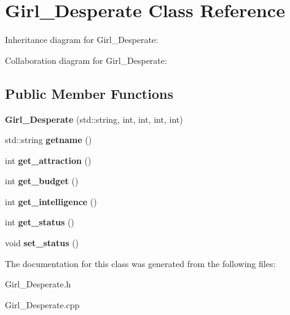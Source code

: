 \hypertarget{classGirl__Desperate}{}\section{Girl\+\_\+\+Desperate Class Reference}
\label{classGirl__Desperate}


Inheritance diagram for Girl\+\_\+\+Desperate\+:


Collaboration diagram for Girl\+\_\+\+Desperate\+:
\subsection*{Public Member Functions}
\begin{DoxyCompactItemize}
\item 
{\bfseries Girl\+\_\+\+Desperate} (std\+::string, int, int, int, int)\hypertarget{classGirl__Desperate_add023864f71aee01c2e7efe84e8ce83d}{}\label{classGirl__Desperate_add023864f71aee01c2e7efe84e8ce83d}

\item 
std\+::string {\bfseries getname} ()\hypertarget{classGirl__Desperate_a4f0be5205c7ae8b0829a9101e2898010}{}\label{classGirl__Desperate_a4f0be5205c7ae8b0829a9101e2898010}

\item 
int {\bfseries get\+\_\+attraction} ()\hypertarget{classGirl__Desperate_ac47c5f05c9058b5d1f2ef0dc95e3c8a0}{}\label{classGirl__Desperate_ac47c5f05c9058b5d1f2ef0dc95e3c8a0}

\item 
int {\bfseries get\+\_\+budget} ()\hypertarget{classGirl__Desperate_af09039e413575be4e3320b22a2dbb176}{}\label{classGirl__Desperate_af09039e413575be4e3320b22a2dbb176}

\item 
int {\bfseries get\+\_\+intelligence} ()\hypertarget{classGirl__Desperate_acfa34b818088ca6abe315d0b4fa19552}{}\label{classGirl__Desperate_acfa34b818088ca6abe315d0b4fa19552}

\item 
int {\bfseries get\+\_\+status} ()\hypertarget{classGirl__Desperate_ad52564d8ebde5752b22d276252807eb8}{}\label{classGirl__Desperate_ad52564d8ebde5752b22d276252807eb8}

\item 
void {\bfseries set\+\_\+status} ()\hypertarget{classGirl__Desperate_a4c7404610e74e10a643022051dccb028}{}\label{classGirl__Desperate_a4c7404610e74e10a643022051dccb028}

\end{DoxyCompactItemize}


The documentation for this class was generated from the following files\+:\begin{DoxyCompactItemize}
\item 
Girl\+\_\+\+Desperate.\+h\item 
Girl\+\_\+\+Desperate.\+cpp\end{DoxyCompactItemize}
